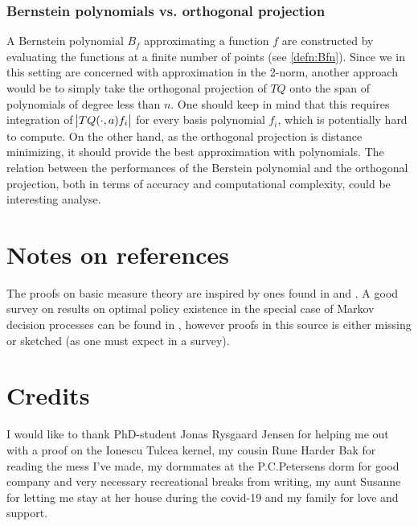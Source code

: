 \subsubsection{Bernstein polynomials vs. orthogonal projection}
A Bernstein polynomial $B_f$ approximating a function $f$
are constructed by evaluating the
functions at a finite number of points (see \cref{defn:Bfn}).
Since we in this setting are concerned with approximation in the 2-norm,
another approach would be to simply take the orthogonal projection of
$TQ$ onto the span of polynomials of degree less than $n$.
One should keep in mind that this requires integration of
$\abs{TQ(\cdot, a) f_i}$ for every basis polynomial $f_i$,
which is potentially hard to compute.
On the other hand, as the orthogonal projection is distance minimizing,
it should provide the best approximation with polynomials.
The relation between the performances of the Berstein polynomial
and the orthogonal projection, both in terms of accuracy and 
computational complexity, could be interesting analyse.

\section{Notes on references}
The proofs on basic measure theory are inspired by ones found in
 and .
A good survey on results on optimal policy existence in the special case
of Markov decision processes can be found in ,
however proofs in this source is either missing or sketched
(as one must expect in a survey).

\section{Credits}
I would like to thank PhD-student Jonas Rysgaard Jensen for helping me
out with a proof on the Ionescu Tulcea kernel,
my cousin Rune Harder Bak for reading the mess I've made,
my dormmates at the P.C.Petersens dorm for good company and very necessary
recreational breaks from writing,
my aunt Susanne for letting me stay at her house during the covid-19 and
my family for love and support.

